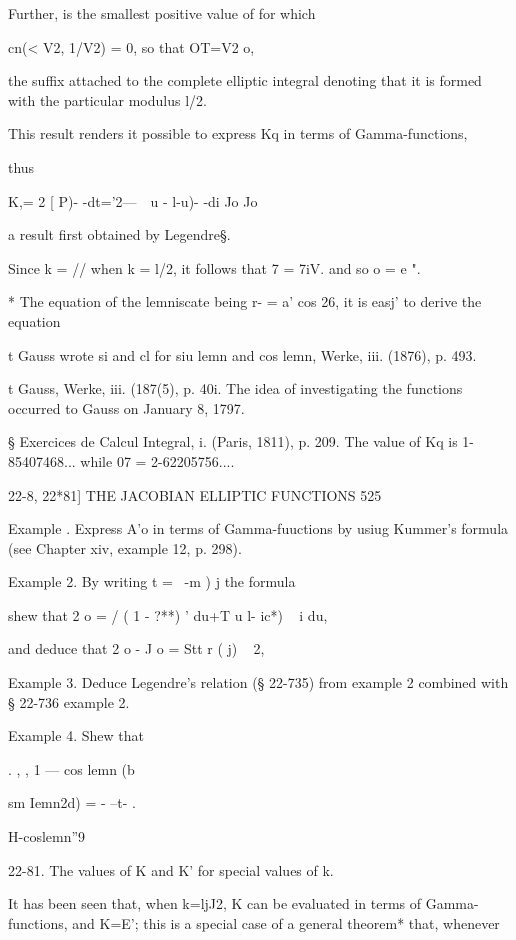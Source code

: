Further, is the smallest positive value of for which

cn(< V2, 1/V2) = 0, so that OT=V2 o,

the suffix attached to the complete elliptic integral denoting that it
is formed with the particular modulus l/\/2.

This result renders it possible to express Kq in terms of
Gamma-functions,

thus

K,= 2 [ P)- -dt='2---\ \ u - l-u)- -di Jo Jo

a result first obtained by Legendre§.

Since k = // when k = l/\/2, it follows that 7 = 7iV. and so o = e ".

* The equation of the lemniscate being r- = a' cos 26, it is easj' to
derive the equation


t Gauss wrote si and cl for siu lemn and cos lemn, Werke, iii. (1876),
p. 493.

t Gauss, Werke, iii. (187(5), p. 40i. The idea of investigating the
functions occurred to Gauss on January 8, 1797.

§ Exercices de Calcul Integral, i. (Paris, 1811), p. 209. The value of
Kq is 1-85407468... while 07 = 2-62205756....

22-8, 22*81] THE JACOBIAN ELLIPTIC FUNCTIONS 525

Example . Express A'o in terms of Gamma-fuuctions by usiug Kummer's
formula (see Chapter xiv, example 12, p. 298).

Example 2. By writing t = \ -m ) j the formula

shew that 2 o = / ( 1 - ?**) ' du+T u l- ic*) ~ i du,

and deduce that 2 o - J o = Stt r ( j) ~ 2,

Example 3. Deduce Legendre's relation (§ 22-735) from example 2
combined with § 22-736 example 2.

Example 4. Shew that

. , , 1 — cos lemn (b

sm Iemn2d) = - --t- .

H-coslemn''9

22-81. The values of K and K' for special values of k.

It has been seen that, when k=ljJ2, K can be evaluated in terms of
Gamma-functions, and K=E'; this is a special case of a general
theorem* that, whenever

